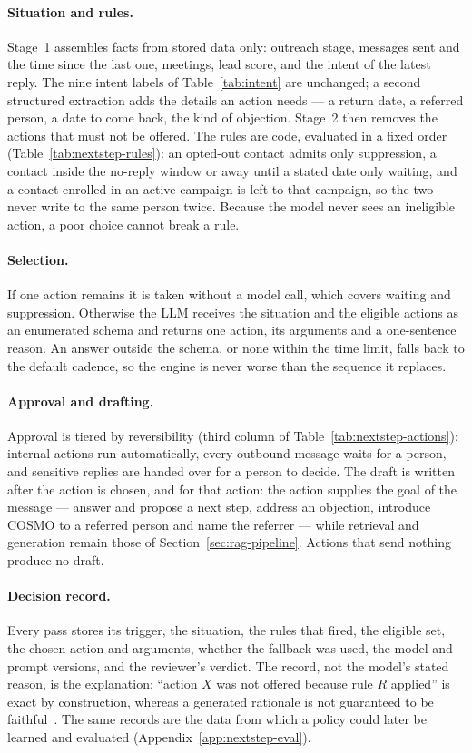 \documentclass[a4paper]{article}
\begin{document}
\paragraph{Situation and rules.} Stage~1 assembles facts from stored data
only: outreach stage, messages sent and the time since the last one,
meetings, lead score, and the intent of the latest reply. The nine intent
labels of Table~\ref{tab:intent} are unchanged; a second structured
extraction adds the details an action needs --- a return date, a referred
person, a date to come back, the kind of objection. Stage~2 then removes
the actions that must not be offered. The rules are code, evaluated in a
fixed order (Table~\ref{tab:nextstep-rules}): an opted-out contact admits
only suppression, a contact inside the no-reply window or away until a
stated date only waiting, and a contact enrolled in an active campaign is
left to that campaign, so the two never write to the same person twice.
Because the model never sees an ineligible action, a poor choice cannot
break a rule.

\paragraph{Selection.} If one action remains it is taken without a model
call, which covers waiting and suppression. Otherwise the LLM receives the
situation and the eligible actions as an enumerated schema and returns one
action, its arguments and a one-sentence reason. An answer outside the
schema, or none within the time limit, falls back to the default cadence,
so the engine is never worse than the sequence it replaces.

\paragraph{Approval and drafting.} Approval is tiered by reversibility
(third column of Table~\ref{tab:nextstep-actions}): internal actions run
automatically, every outbound message waits for a person, and sensitive
replies are handed over for a person to decide. The draft is written after
the action is chosen, and for that action: the action supplies the goal of
the message --- answer and propose a next step, address an objection,
introduce COSMO to a referred person and name the referrer --- while
retrieval and generation remain those of Section~\ref{sec:rag-pipeline}.
Actions that send nothing produce no draft.

\paragraph{Decision record.} Every pass stores its trigger, the situation,
the rules that fired, the eligible set, the chosen action and arguments,
whether the fallback was used, the model and prompt versions, and the
reviewer's verdict. The record, not the model's stated reason, is the
explanation: ``action $X$ was not offered because rule $R$ applied'' is
exact by construction, whereas a generated rationale is not guaranteed to
be faithful~\cite{turpin2023unfaithful}. The same records are the data from
which a policy could later be learned and evaluated
(Appendix~\ref{app:nextstep-eval}).
\end{document}
